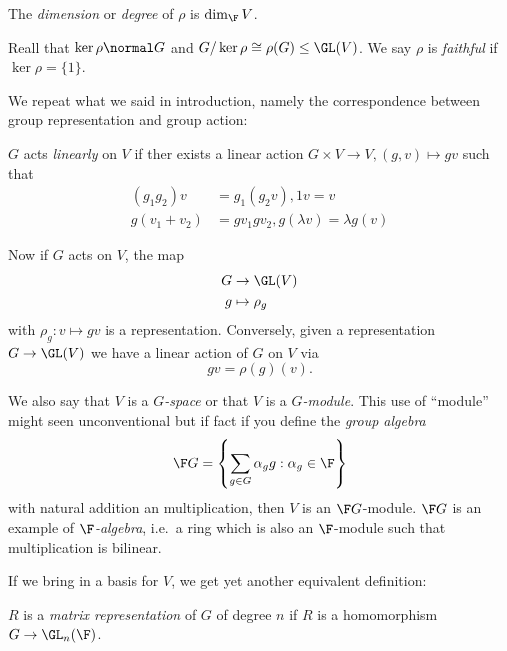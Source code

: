 \documentclass[a4paper]{article}
\begin{document}
The \emph{dimension} or \emph{degree} of \(\rho\) is \(\dim_\F V\).

Reall that \(\ker \rho \normal G\) and \(G / \ker \rho \cong \rho(G) \leq \GL(V)\). We say \(\rho\) is \emph{faithful} if \(\ker \rho = \{1\}\).

We repeat what we said in introduction, namely the correspondence between group representation and group action:

\begin{definition}
  \(G\) acts \emph{linearly} on \(V\) if ther exists a linear action \(G \times V \to V, (g, v) \mapsto gv\) such that
  \begin{align*}
    (g_1g_2) v &= g_1(g_2v), 1 v = v \\
    g(v_1 + v_2) &= gv_1 gv_2, g(\lambda v) = \lambda g(v)
  \end{align*}
\end{definition}

Now if \(G\) acts on \(V\), the map
\begin{align*}
  G &\to \GL(V) \\
  g &\mapsto \rho_g
\end{align*}
with \(\rho_g: v \mapsto gv\) is a representation. Conversely, given a representation \(G \to \GL(V)\) we have a linear action of \(G\) on \(V\) via
\[
  gv = \rho(g)(v).
\]

\begin{remark}
  We also say that \(V\) is a \emph{\(G\)-space} or that \(V\) is a \emph{\(G\)-module}. This use of ``module'' might seen unconventional but if fact if you define the \emph{group algebra}
  \[
    \F G = \left\{ \sum_{g\in G} \alpha_g g: \alpha_g \in \F \right\}
  \]
  with natural addition an multiplication, then \(V\) is an \(\F G\)-module. \(\F G\) is an example of \emph{\(\F\)-algebra}, i.e.\ a ring which is also an \(\F\)-module such that multiplication is bilinear.
\end{remark}

If we bring in a basis for \(V\), we get yet another equivalent definition:

\begin{definition}
  \(R\) is a \emph{matrix representation} of \(G\) of degree \(n\) if \(R\) is a homomorphism \(G \to \GL_n(\F)\).
\end{definition}
\end{document}

